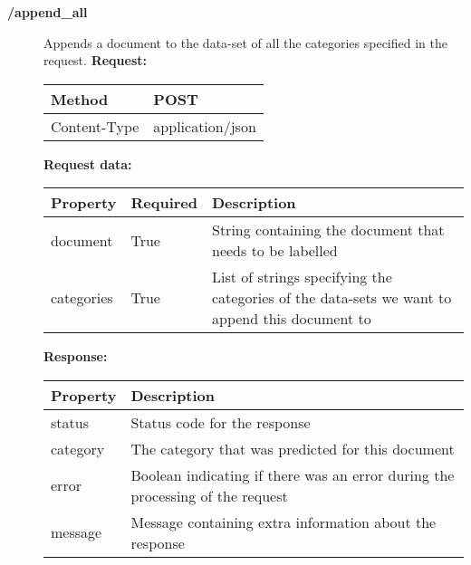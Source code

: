 \begin{description}
\item[{\large \textbf{/append\_all}}]
Appends a document to the data-set of all the categories specified in the request.
\newline
\newline
\textbf{Request:}
\newline
\newline
\begin{tabular}{ | l | l |}
\hline
Method & POST\\ \hline
Content-Type & application/json\\ \hline
\end{tabular}
\newline
\newline
\textbf{Request data:}
\newline
\newline
\resizebox{\textwidth}{!} {
\begin{tabular}{ | l | l | l |}
\hline
\textbf{Property} & \textbf{Required} & \textbf{Description}\\ \hline
document & True & String containing the document that needs to be labelled\\ \hline
categories & True & List of strings specifying the categories of the data-sets we want to append this document to\\ \hline
\end{tabular}}
\newline
\newline
\textbf{Response:}
\newline
\newline
\resizebox{\textwidth}{!} {
\begin{tabular}{ | l | l |}
\hline
\textbf{Property} & \textbf{Description}\\ \hline
status & Status code for the response\\ \hline
category & The category that was predicted for this document\\ \hline
error & Boolean indicating if there was an error during the processing of the request\\ \hline
message & Message containing extra information about the response\\ \hline
\end{tabular}}


\end{description}
